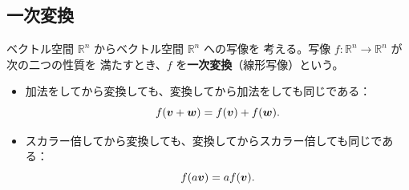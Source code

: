 \subsection{一次変換}

ベクトル空間 $\mathbb{R}^n$ からベクトル空間 $\mathbb{R}^n$ への写像を
考える。写像 $f\colon\mathbb{R}^n\to\mathbb{R}^n$ が次の二つの性質を
満たすとき、$f$ を\textbf{一次変換}（線形写像）という。
\begin{itemize}
 \item 加法をしてから変換しても、変換してから加法をしても同じである：
 \begin{equation}
  f(\bm{v}+\bm{w})=f(\bm{v})+f(\bm{w}).
 \end{equation}
 \item スカラー倍してから変換しても、変換してからスカラー倍しても同じである：
 \begin{equation}
  f(a\bm{v})=a f(\bm{v}).
 \end{equation}
\end{itemize}

